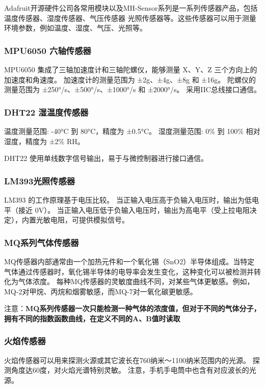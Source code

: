Adafruit开源硬件公司各常用模块以及MH-Sensor系列是一系列传感器产品，包括温度传感器、湿度传感器、气压传感器
光照传感器等。这些传感器可以用于测量环境参数，例如温度、湿度、气压、光照等。

\subsubsection{MPU6050 六轴传感器}

MPU6050 集成了三轴加速度计和三轴陀螺仪，能够测量 X、Y、Z 三个方向上的加速度和角速度。
加速度计的测量范围为 ±2g、±4g、±8g 和 ±16g。
陀螺仪的测量范围为 ±250°/s、±500°/s、±1000°/s 和 ±2000°/s。
采用IIC总线接口通信。

\subsubsection{DHT22 湿温度传感器}

温度测量范围: -40°C 到 80°C，精度为 ±0.5°C。
湿度测量范围: 0\% 到 100\% 相对湿度，精度为 ±2\% RH。

DHT22 使用单线数字信号输出，易于与微控制器进行接口通信。

\subsubsection{LM393光照传感器}

LM393 的工作原理基于电压比较。
当正输入电压高于负输入电压时，输出为低电平（接近 0V）。
当正输入电压低于负输入电压时，输出为高电平（受上拉电阻决定），内置光敏电阻，可提供模拟信号。

\subsubsection{MQ系列气体传感器}

MQ传感器内部通常由一个加热元件和一个氧化锡（SnO2）半导体组成。当特定气体通过传感器时，氧化锡半导体的电导率会发生变化，这种变化可以被检测并转化为气体浓度。
每种MQ传感器的灵敏度曲线不同，对某些气体更敏感。例如，MQ-2对甲烷、丙烷和烟雾敏感，而MQ-7对一氧化碳更敏感。

注意：\textbf{MQ系列传感器一次只能检测一种气体的浓度值，但对于不同的气体分子，拥有不同的指数函数曲线，在定义不同的A、B值时读取}

\subsubsection{火焰传感器}

火焰传感器可以用来探测火源或其它波长在760纳米～1100纳米范围内的光源。
探测角度达60度，对火焰光谱特别灵敏。
注意，手机手电筒中也含有对应波长的光源。